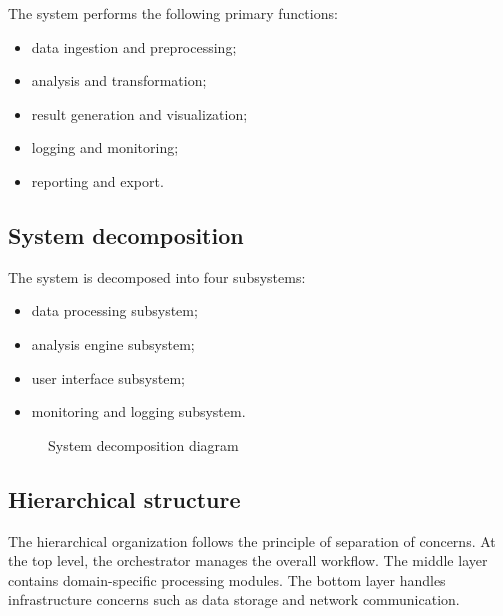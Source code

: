 The system performs the following primary functions:
\begin{itemize}
  \item data ingestion and preprocessing;
  \item analysis and transformation;
  \item result generation and visualization;
  \item logging and monitoring;
  \item reporting and export.
\end{itemize}

\subsection{System decomposition}

The system is decomposed into four subsystems:
\begin{itemize}
  \item data processing subsystem;
  \item analysis engine subsystem;
  \item user interface subsystem;
  \item monitoring and logging subsystem.
\end{itemize}

\begin{figure}[htbp]
  \centering
  \caption{System decomposition diagram}\label{fig:decomposition}
\end{figure}

\subsection{Hierarchical structure}

The hierarchical organization follows the principle of separation of concerns.
At the top level, the orchestrator manages the overall workflow.
The middle layer contains domain-specific processing modules.
The bottom layer handles infrastructure concerns such as data storage and network communication.

